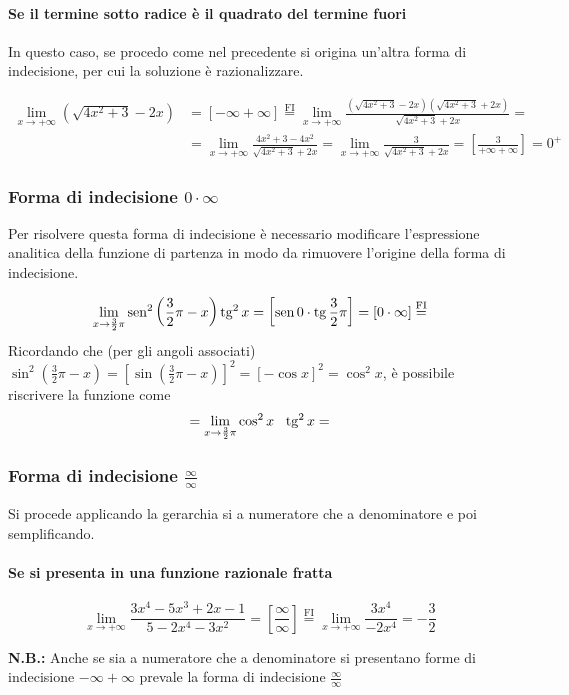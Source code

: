 \documentclass{book}     %
\begin{document}
\paragraph{Se il termine sotto radice è il quadrato del termine fuori}
In questo caso, se procedo come nel precedente si origina un'altra forma di indecisione, per cui la soluzione è razionalizzare.
\begin{ex}
\[\begin{aligned}\lim_{x\to +\infty}\left(\sqrt{4x^2+3}-2x\right)&=[-\infty+\infty]\overset{\mathrm{FI}}{=}\lim_{x\to +\infty}\frac{\left(\sqrt{4x^2+3}-2x\right)\left(\sqrt{4x^2+3}+2x\right)}{\sqrt{4x^2+3}+2x} = \\ &=\lim_{x\to +\infty}\frac{4x^2+3-4x^2}{\sqrt{4x^2+3}+2x}=\lim_{x\to +\infty}\frac{3}{\sqrt{4x^2+3}+2x}=\left[\frac{3}{+\infty+\infty}\right]=0^ +\end{aligned}\]
\end{ex}
\subsubsection{Forma di indecisione $0\cdot \infty$}
Per risolvere questa forma di indecisione è necessario modificare l'espressione analitica della funzione di partenza in modo da rimuovere l'origine della forma di indecisione.
\begin{ex}
\[\lim_{x\to\frac{3}{2}\pi}\operatorname{sen}^2\left(\frac{3}{2}\pi-x\right)\operatorname{tg}^2x=\left[\operatorname{sen} 0 \cdot \operatorname{tg} \frac{3}{2}\pi\right]=[0\cdot \infty]\overset{\mathrm{FI}}{ = }\]
Ricordando che (per gli angoli associati) $\scriptstyle\sin^2\left(\frac{3}{2}\pi-x\right)= \left[\sin\left(\frac{3}{2}\pi-x\right)\right]^2=[-\cos x]^2=\cos^2 x$, è possibile riscrivere la funzione come \\ 
\[=\lim_{x\to\frac{3}{2}\pi}\cos^2x~~\operatorname{tg}^2x =\]
\end{ex}
\subsubsection{Forma di indecisione $\frac{\infty}{\infty}$}
Si procede applicando la gerarchia si a numeratore che a denominatore e poi semplificando.
\paragraph{Se si presenta in una funzione razionale fratta}
\begin{ex}
\[\lim_{x\to +\infty}\frac{3x^4-5x^3+2x-1}{5-2x^4-3x^2}=\left[\frac{\infty}{\infty}\right]\overset{\mathrm{FI}}{=}\lim_{x\to +\infty}\frac{3x^4}{-2x^4}=-\frac{3}{2}\]
\end{ex}
\textbf{N.B.:} Anche se sia a numeratore che a denominatore si presentano forme di indecisione $-\infty+\infty$ prevale la forma di indecisione $\frac{\infty}{\infty}$
\end{document}
